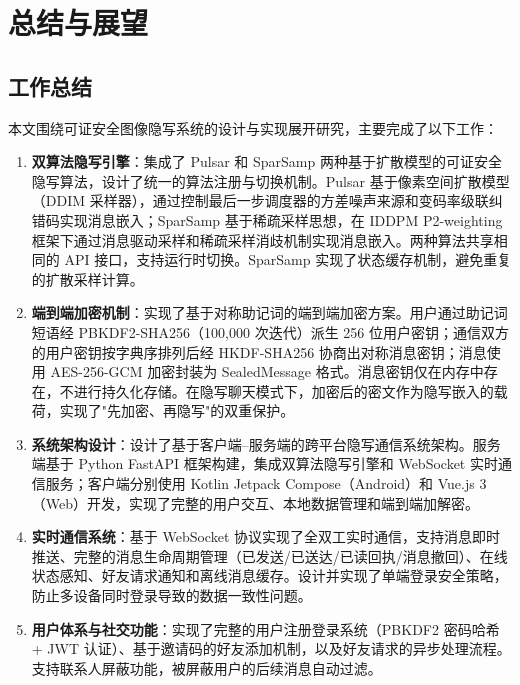 \section{总结与展望}\label{chap:conclusion}

\subsection{工作总结}

本文围绕可证安全图像隐写系统的设计与实现展开研究，主要完成了以下工作：

\begin{enumerate}
    \item \textbf{双算法隐写引擎}：集成了 Pulsar 和 SparSamp 两种基于扩散模型的可证安全隐写算法，设计了统一的算法注册与切换机制。Pulsar 基于像素空间扩散模型（DDIM 采样器），通过控制最后一步调度器的方差噪声来源和变码率级联纠错码实现消息嵌入；SparSamp 基于稀疏采样思想，在 IDDPM P2-weighting 框架下通过消息驱动采样和稀疏采样消歧机制实现消息嵌入。两种算法共享相同的 API 接口，支持运行时切换。SparSamp 实现了状态缓存机制，避免重复的扩散采样计算。

    \item \textbf{端到端加密机制}：实现了基于对称助记词的端到端加密方案。用户通过助记词短语经 PBKDF2-SHA256（100,000 次迭代）派生 256 位用户密钥；通信双方的用户密钥按字典序排列后经 HKDF-SHA256 协商出对称消息密钥；消息使用 AES-256-GCM 加密封装为 SealedMessage 格式。消息密钥仅在内存中存在，不进行持久化存储。在隐写聊天模式下，加密后的密文作为隐写嵌入的载荷，实现了"先加密、再隐写"的双重保护。

    \item \textbf{系统架构设计}：设计了基于客户端--服务端的跨平台隐写通信系统架构。服务端基于 Python FastAPI 框架构建，集成双算法隐写引擎和 WebSocket 实时通信服务；客户端分别使用 Kotlin Jetpack Compose（Android）和 Vue.js 3（Web）开发，实现了完整的用户交互、本地数据管理和端到端加解密。

    \item \textbf{实时通信系统}：基于 WebSocket 协议实现了全双工实时通信，支持消息即时推送、完整的消息生命周期管理（已发送/已送达/已读回执/消息撤回）、在线状态感知、好友请求通知和离线消息缓存。设计并实现了单端登录安全策略，防止多设备同时登录导致的数据一致性问题。

    \item \textbf{用户体系与社交功能}：实现了完整的用户注册登录系统（PBKDF2 密码哈希 + JWT 认证）、基于邀请码的好友添加机制，以及好友请求的异步处理流程。支持联系人屏蔽功能，被屏蔽用户的后续消息自动过滤。


\end{enumerate}

